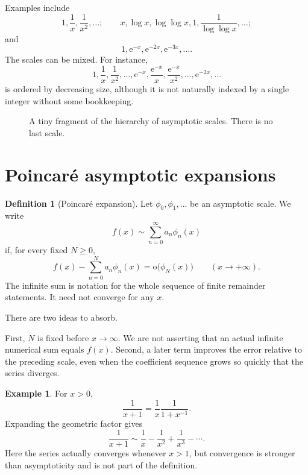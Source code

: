 \documentclass[11pt,openany]{book}
\theoremstyle{definition}
\newtheorem{definition}{Definition}[chapter]
\newtheorem{example}{Example}[chapter]
\theoremstyle{plain}
\theoremstyle{remark}
\newcommand{\e}{\mathrm{e}}
\newcommand{\smallo}{\mathrm{o}}
\newcommand{\asym}{\sim}
\newcommand{\succdom}{\succ}
\begin{document}
Examples include
\[
 1,\frac1x,\frac1{x^2},\ldots;
 \qquad
 x,\log x,\log\log x,1,\frac1{\log\log x},\ldots;
\]
and
\[
 1,\e^{-x},\e^{-2x},\e^{-3x},\ldots.
\]
The scales can be mixed. For instance,
\[
 1,\frac1x,\frac1{x^2},\ldots,\e^{-x},\frac{\e^{-x}}x,
 \frac{\e^{-x}}{x^2},\ldots,\e^{-2x},\ldots
\]
is ordered by decreasing size, although it is not naturally indexed by a single integer without some bookkeeping.

\begin{figure}[htbp]
\centering
{}
\caption{A tiny fragment of the hierarchy of asymptotic scales. There is no last scale.}
\label{fig:scale-hierarchy}
\end{figure}

\section{Poincar\'e asymptotic expansions}

\begin{definition}[Poincar\'e expansion]
Let $\phi_0,\phi_1,\ldots$ be an asymptotic scale. We write
\[
 f(x)\asym \sum_{n=0}^{\infty}a_n\phi_n(x)
\]
if, for every fixed $N\ge0$,
\[
 f(x)-\sum_{n=0}^{N}a_n\phi_n(x)
   =\smallo\bigl(\phi_N(x)\bigr)
 \qquad(x\to+\infty).
\]
The infinite sum is notation for the whole sequence of finite remainder statements. It need not converge for any $x$.
\end{definition}

There are two ideas to absorb.

First, $N$ is fixed before $x\to\infty$. We are not asserting that an actual infinite numerical sum equals $f(x)$. Second, a later term improves the error relative to the preceding scale, even when the coefficient sequence grows so quickly that the series diverges.

\begin{example}
For $x>0$,
\[
 \frac1{x+1}=\frac1x\frac1{1+x^{-1}}.
\]
Expanding the geometric factor gives
\[
 \frac1{x+1}\asym \frac1x-\frac1{x^2}+\frac1{x^3}-\cdots.
\]
Here the series actually converges whenever $x>1$, but convergence is stronger than asymptoticity and is not part of the definition.
\end{example}
\end{document}
